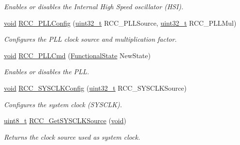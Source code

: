 \begin{DoxyCompactItemize}
\begin{DoxyCompactList}\small\item\em Enables or disables the Internal High Speed oscillator (H\+SI). \end{DoxyCompactList}\item 
\hyperlink{usb__devapi_8h_afabf60e7f57651d6d595a02c75f07cd0}{void} \hyperlink{group___r_c_c___exported___functions_ga0f67634cbe721f2c42f022d2a93229c8}{R\+C\+C\+\_\+\+P\+L\+L\+Config} (\hyperlink{_p_e___types_8h_a33594304e786b158f3fb30289278f5af}{uint32\+\_\+t} R\+C\+C\+\_\+\+P\+L\+L\+Source, \hyperlink{_p_e___types_8h_a33594304e786b158f3fb30289278f5af}{uint32\+\_\+t} R\+C\+C\+\_\+\+P\+L\+L\+Mul)
\begin{DoxyCompactList}\small\item\em Configures the P\+LL clock source and multiplication factor. \end{DoxyCompactList}\item 
\hyperlink{usb__devapi_8h_afabf60e7f57651d6d595a02c75f07cd0}{void} \hyperlink{group___r_c_c___exported___functions_ga84dee53c75e58fdb53571716593c2272}{R\+C\+C\+\_\+\+P\+L\+L\+Cmd} (\hyperlink{agilefox_2library_2inc_2stm32f10x__type_8h_ac9a7e9a35d2513ec15c3b537aaa4fba1}{Functional\+State} New\+State)
\begin{DoxyCompactList}\small\item\em Enables or disables the P\+LL. \end{DoxyCompactList}\item 
\hyperlink{usb__devapi_8h_afabf60e7f57651d6d595a02c75f07cd0}{void} \hyperlink{group___r_c_c___exported___functions_ga3551a36a8f0a3dc96a74d6b939048337}{R\+C\+C\+\_\+\+S\+Y\+S\+C\+L\+K\+Config} (\hyperlink{_p_e___types_8h_a33594304e786b158f3fb30289278f5af}{uint32\+\_\+t} R\+C\+C\+\_\+\+S\+Y\+S\+C\+L\+K\+Source)
\begin{DoxyCompactList}\small\item\em Configures the system clock (S\+Y\+S\+C\+LK). \end{DoxyCompactList}\item 
\hyperlink{_p_e___types_8h_aba7bc1797add20fe3efdf37ced1182c5}{uint8\+\_\+t} \hyperlink{group___r_c_c___exported___functions_gaaeb32311c208b2a980841c9c884a41ea}{R\+C\+C\+\_\+\+Get\+S\+Y\+S\+C\+L\+K\+Source} (\hyperlink{usb__devapi_8h_afabf60e7f57651d6d595a02c75f07cd0}{void})
\begin{DoxyCompactList}\small\item\em Returns the clock source used as system clock. \end{DoxyCompactList}\item 

\end{DoxyCompactItemize}
